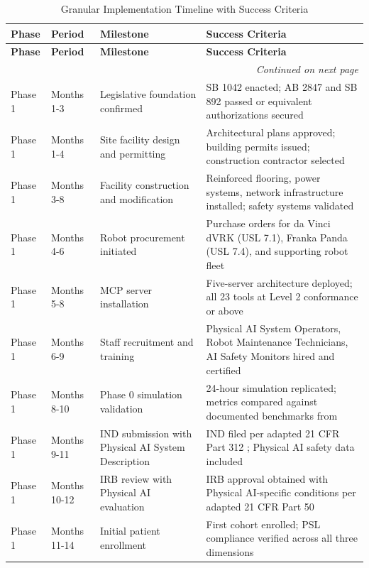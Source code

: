 \begin{longtable}{l l p{4.0cm} p{4.5cm}}
\caption{Granular Implementation Timeline with Success Criteria}
\label{tab:impl-detailed-timeline} \\
\toprule
\textbf{Phase} & \textbf{Period} & \textbf{Milestone} & \textbf{Success Criteria} \\
\midrule
\endfirsthead
\toprule
\textbf{Phase} & \textbf{Period} & \textbf{Milestone} & \textbf{Success Criteria} \\
\midrule
\endhead
\midrule
\multicolumn{4}{r}{\textit{Continued on next page}} \\
\bottomrule
\endfoot
\bottomrule
\endlastfoot
Phase 1 & Months 1-3 & Legislative foundation confirmed & SB 1042 enacted; AB 2847 and SB 892 passed or equivalent authorizations secured \\
Phase 1 & Months 1-4 & Site facility design and permitting & Architectural plans approved; building permits issued; construction contractor selected \\
Phase 1 & Months 3-8 & Facility construction and modification & Reinforced flooring, power systems, network infrastructure installed; safety systems validated \\
Phase 1 & Months 4-6 & Robot procurement initiated & Purchase orders for da Vinci dVRK (USL 7.1), Franka Panda (USL 7.4), and supporting robot fleet \\
Phase 1 & Months 5-8 & MCP server installation & Five-server architecture deployed; all 23 tools at Level 2 conformance or above \\
Phase 1 & Months 6-9 & Staff recruitment and training & Physical AI System Operators, Robot Maintenance Technicians, AI Safety Monitors hired and certified \\
Phase 1 & Months 8-10 & Phase 0 simulation validation & 24-hour simulation replicated; metrics compared against documented benchmarks from \cite{site-docs} \\
Phase 1 & Months 9-11 & IND submission with Physical AI System Description & IND filed per adapted 21 CFR Part 312 \cite{cfr312-adapt}; Physical AI safety data included \\
Phase 1 & Months 10-12 & IRB review with Physical AI evaluation & IRB approval obtained with Physical AI-specific conditions per adapted 21 CFR Part 50 \cite{cfr50-adapt} \\
Phase 1 & Months 11-14 & Initial patient enrollment & First cohort enrolled; PSL compliance verified across all three dimensions \\

\end{longtable}
